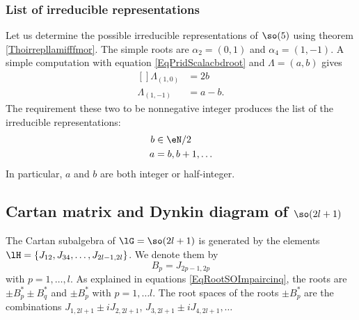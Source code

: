 \subsubsection{List of irreducible representations}

Let us determine the possible irreducible representations of $\so(5)$ using theorem \ref{Thoirrepllamifffmor}. The simple roots are $\alpha_2=(0,1)$ and $\alpha_4=(1,-1)$. A simple computation with equation \eqref{EqPridScalacbdroot} and $\Lambda=(a,b)$ gives
\begin{equation}
	\begin{aligned}[]
		\Lambda_{(1,0)}&=2b\\		
		\Lambda_{(1,-1)}&=a-b.
	\end{aligned}
\end{equation}
The requirement these two to be nonnegative integer produces the list of the irreducible representations:
\begin{equation}			\label{EqIrrepsso5}
	\begin{aligned}[]
		b&\in \eN/2\\
		a&=b,b+1,\ldots
	\end{aligned}
\end{equation}
In particular, $a$ and $b$ are both integer or half-integer.

\subsection{Cartan matrix and Dynkin diagram of \texorpdfstring{$\so(2l+1)$}{so2l+1}}

The Cartan subalgebra of $\lG=\so(2l+1)$ is generated by the elements $\lH=\{ J_{12},J_{34},\ldots,J_{2l-1,2l} \}$.  We denote them by
\begin{equation}
	B_p=J_{2p-1,2p}
\end{equation}
with $p=1,\ldots,l$. As explained in equations \eqref{EqRootSOImpaircinq}, the roots are $\pm B_p^*\pm B_q^*$ and $\pm B_p^*$ with $p=1,\ldots l$. The root spaces of the roots $\pm B^*_p$ are the combinations $J_{1,2l+1}\pm iJ_{2,2l+1}$, $J_{3,2l+1}\pm iJ_{4,2l+1},\ldots$

